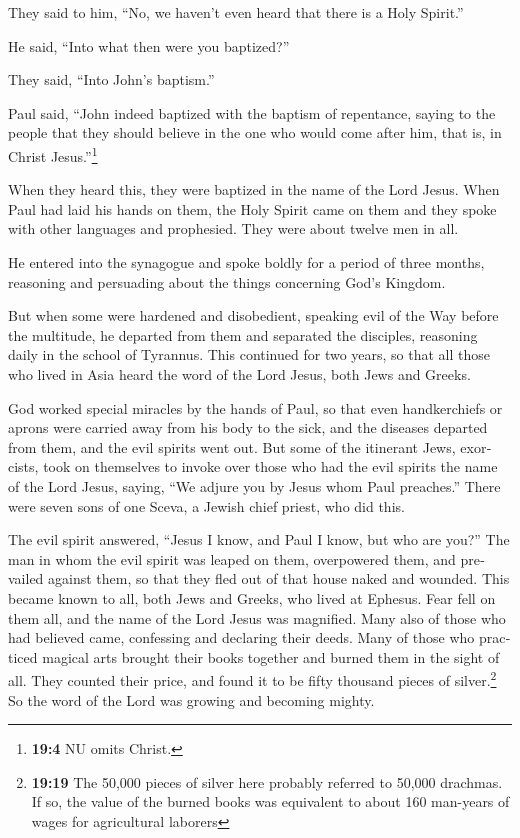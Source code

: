\begin{paracol}{2}
\begin{otherlanguage}{english}
They said to him, ``No, we haven't even heard that there is a Holy
Spirit.''

 He said, ``Into what then were you baptized?''

They said, ``Into John's baptism.''

 Paul said, ``John indeed baptized with the baptism of
repentance, saying to the people that they should believe in the one who
would come after him, that is, in Christ Jesus.''\footnote{\textbf{19:4}
  NU omits Christ.}

 When they heard this, they were baptized in the name of
the Lord Jesus.  When Paul had laid his hands on them, the
Holy Spirit came on them and they spoke with other languages and
prophesied.  They were about twelve men in all.

 He entered into the synagogue and spoke boldly for a
period of three months, reasoning and persuading about the things
concerning God's Kingdom.

 But when some were hardened and disobedient, speaking
evil of the Way before the multitude, he departed from them and
separated the disciples, reasoning daily in the school of Tyrannus.
 This continued for two years, so that all those who
lived in Asia heard the word of the Lord Jesus, both Jews and Greeks.

 God worked special miracles by the hands of Paul,
 so that even handkerchiefs or aprons were carried away
from his body to the sick, and the diseases departed from them, and the
evil spirits went out.  But some of the itinerant Jews,
exorcists, took on themselves to invoke over those who had the evil
spirits the name of the Lord Jesus, saying, ``We adjure you by Jesus
whom Paul preaches.''  There were seven sons of one
Sceva, a Jewish chief priest, who did this.

 The evil spirit answered, ``Jesus I know, and Paul I
know, but who are you?''  The man in whom the evil spirit
was leaped on them, overpowered them, and prevailed against them, so
that they fled out of that house naked and wounded.  This
became known to all, both Jews and Greeks, who lived at Ephesus. Fear
fell on them all, and the name of the Lord Jesus was magnified.
 Many also of those who had believed came, confessing and
declaring their deeds.  Many of those who practiced
magical arts brought their books together and burned them in the sight
of all. They counted their price, and found it to be fifty thousand
pieces of silver.\footnote{\textbf{19:19} The 50,000 pieces of silver
  here probably referred to 50,000 drachmas. If so, the value of the
  burned books was equivalent to about 160 man-years of wages for
  agricultural laborers}  So the word of the Lord was
growing and becoming mighty.


\end{otherlanguage}
\end{paracol}
